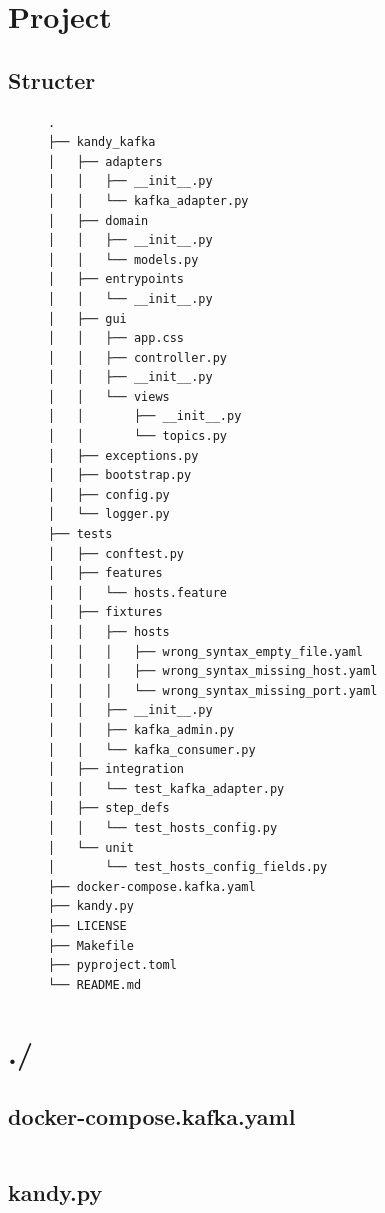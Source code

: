 \documentclass[10pt , a4paper]{report}
\newenvironment{code}{\captionsetup{type=listing}}{}
\begin{document}
\newpage
\section{Project}\label{appendix:project}
\subsection{Structer}
\begin{figure}[htbp]
\centering
  \begin{small}
    \begin{BVerbatim}
.
├── kandy_kafka
│   ├── adapters
│   │   ├── __init__.py
│   │   └── kafka_adapter.py
│   ├── domain
│   │   ├── __init__.py
│   │   └── models.py
│   ├── entrypoints
│   │   └── __init__.py
│   ├── gui
│   │   ├── app.css
│   │   ├── controller.py
│   │   ├── __init__.py
│   │   └── views
│   │       ├── __init__.py
│   │       └── topics.py
│   ├── exceptions.py
│   ├── bootstrap.py
│   ├── config.py
│   └── logger.py
├── tests
│   ├── conftest.py
│   ├── features
│   │   └── hosts.feature
│   ├── fixtures
│   │   ├── hosts
│   │   │   ├── wrong_syntax_empty_file.yaml
│   │   │   ├── wrong_syntax_missing_host.yaml
│   │   │   └── wrong_syntax_missing_port.yaml
│   │   ├── __init__.py
│   │   ├── kafka_admin.py
│   │   └── kafka_consumer.py
│   ├── integration
│   │   └── test_kafka_adapter.py
│   ├── step_defs
│   │   └── test_hosts_config.py
│   └── unit
│       └── test_hosts_config_fields.py
├── docker-compose.kafka.yaml
├── kandy.py
├── LICENSE
├── Makefile
├── pyproject.toml
└── README.md
      \end{BVerbatim}
    \end{small}
\end{figure}
\newpage

\section{./}
\subsection{docker-compose.kafka.yaml}
\begin{code}
  \inputminted[fontsize=\small]{YAML}{../docker-compose.kafka.yaml}
\end{code}

\subsection{kandy.py}
\begin{code}
  \inputminted[fontsize=\small]{Python}{../kandy.py}
\end{code}
\end{document}
